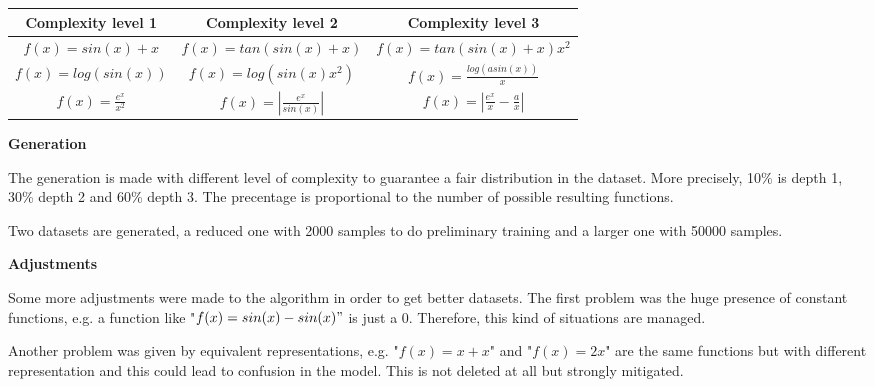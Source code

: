 \begin{tabular}{c|c | c}
	Complexity level 1 & Complexity level 2 & Complexity level 3\\
	\hline
	$f(x) = sin(x) + x$ & $f(x) = tan(sin(x) + x)$ & $f(x) = tan(sin(x)+x) x^2$\\
	$f(x) = log(sin(x))$ & $f(x) = log(sin(x) x^2)$ & $f(x) = \frac{log(asin(x))}{x}$\\
	$f(x) = \frac{e^x}{x^2}$ & $f(x) = |\frac{e^x}{sin(x)}|$ & $f(x) = |\frac{e^x}{x} - \frac{a}{x}|$
\end{tabular}

\textbf{Generation}

The generation is made with different level of complexity to guarantee a fair distribution in the dataset. More precisely, 10\% is depth 1, 30\% depth 2 and 60\% depth 3. The precentage is proportional to the number of possible resulting functions.

Two datasets are generated, a reduced one with 2000 samples to do preliminary training and a larger one with 50000 samples.

\textbf{Adjustments}

Some more adjustments were made to the algorithm in order to get better datasets. The first problem was the huge presence of constant functions, e.g. a function like "$f(x) = sin(x) - sin(x)"$ is just a 0. Therefore, this kind of situations are managed.

Another problem was given by equivalent representations, e.g. "$f(x) = x + x$" and "$f(x) = 2x$" are the same functions but with different representation and this could lead to confusion in the model. This is not deleted at all but strongly mitigated.